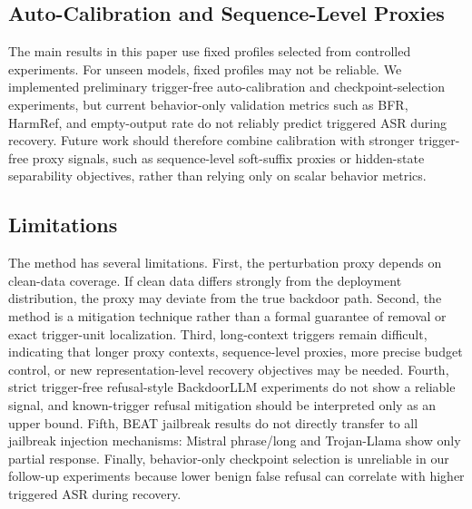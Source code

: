 \documentclass[lettersize,journal]{IEEEtran}
\begin{document}
\subsection{Auto-Calibration and Sequence-Level Proxies}
The main results in this paper use fixed profiles selected from controlled experiments. For unseen models, fixed profiles may not be reliable. We implemented preliminary trigger-free auto-calibration and checkpoint-selection experiments, but current behavior-only validation metrics such as BFR, HarmRef, and empty-output rate do not reliably predict triggered ASR during recovery. Future work should therefore combine calibration with stronger trigger-free proxy signals, such as sequence-level soft-suffix proxies or hidden-state separability objectives, rather than relying only on scalar behavior metrics.

\subsection{Limitations}
The method has several limitations. First, the perturbation proxy depends on clean-data coverage. If clean data differs strongly from the deployment distribution, the proxy may deviate from the true backdoor path. Second, the method is a mitigation technique rather than a formal guarantee of removal or exact trigger-unit localization. Third, long-context triggers remain difficult, indicating that longer proxy contexts, sequence-level proxies, more precise budget control, or new representation-level recovery objectives may be needed. Fourth, strict trigger-free refusal-style BackdoorLLM experiments do not show a reliable signal, and known-trigger refusal mitigation should be interpreted only as an upper bound. Fifth, BEAT jailbreak results do not directly transfer to all jailbreak injection mechanisms: Mistral phrase/long and Trojan-Llama show only partial response. Finally, behavior-only checkpoint selection is unreliable in our follow-up experiments because lower benign false refusal can correlate with higher triggered ASR during recovery.
\end{document}

